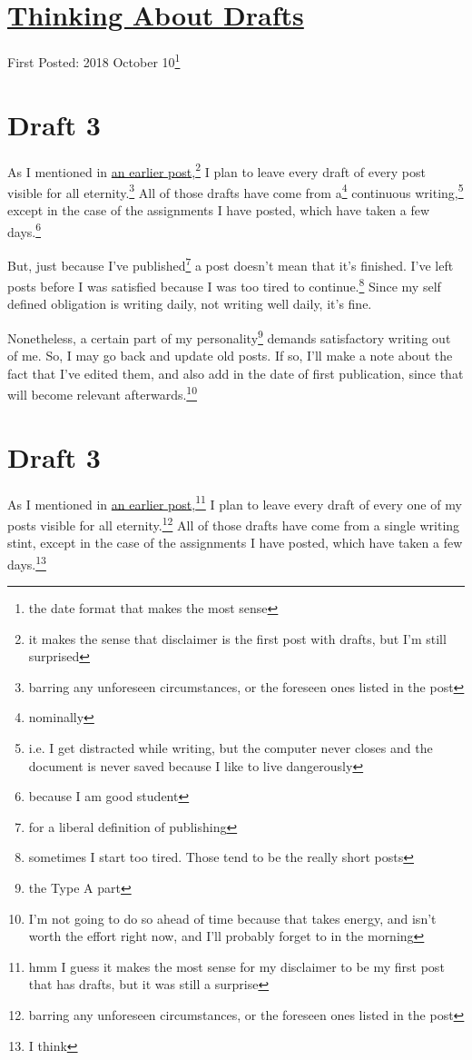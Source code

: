 \documentclass[12pt]{article}[titlepage]
\newcommand{\1}{\={a}}
\newcommand{\2}{\={e}}
\newcommand{\3}{\={\i}}
\newcommand{\4}{\=o}
\newcommand{\5}{\=u}
\newcommand{\6}{\={A}}
\renewcommand{\,}{\textsuperscript{,}}
\begin{document}
\doublespacing
\section{\href{thinking-about-drafts.html}{Thinking About Drafts}}
First Posted: 2018 October 10\footnote{the date format that makes the most sense}
\section{Draft 3}
As I mentioned in \href{disclaimer.html}{an earlier post},\footnote{it makes the sense that disclaimer is the first post with drafts, but I'm still surprised} I plan to leave every draft of every post visible for all eternity.\footnote{barring any unforeseen circumstances, or the foreseen ones listed in the post}
All of those drafts have come from a\footnote{nominally} continuous writing,\footnote{i.e. I get distracted while writing, but the computer never closes and the document is never saved because I like to live dangerously} except in the case of the assignments I have posted, which have taken a few days.\footnote{because I am good student} 

But, just because I've published\footnote{for a liberal definition of publishing} a post doesn't mean that it's finished.
I've left posts before I was satisfied because I was too tired to continue.\footnote{sometimes I start too tired. Those tend to be the really short posts}
Since my self defined obligation is writing daily, not writing well daily, it's fine.

Nonetheless, a certain part of my personality\footnote{the Type A part} demands satisfactory writing out of me.
So, I may go back and update old posts.
If so, I'll make a note about the fact that I've edited them, and also add in the date of first publication, since that will become relevant afterwards.\footnote{I'm not going to do so ahead of time because that takes energy, and isn't worth the effort right now, and I'll probably forget to in the morning}

\section{Draft 3}
As I mentioned in \href{disclaimer.html}{an earlier post},\footnote{hmm I guess it makes the most sense for my disclaimer to be my first post that has drafts, but it was still a surprise} I plan to leave every draft of every one of my posts visible for all eternity.\footnote{barring any unforeseen circumstances, or the foreseen ones listed in the post}
All of those drafts have come from a single writing stint, except in the case of the assignments I have posted, which have taken a few days.\footnote{I think} 
\end{document}
